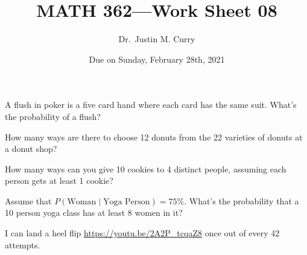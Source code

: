 \documentclass[addpoints,12pt]{exam}
\title{\vspace{-1in} MATH 362---Work Sheet 08}
\date{Due on Sunday, February 28th, 2021}
\author{Dr.~Justin M. Curry}
\begin{document}
\maketitle


\begin{questions}
\question[1] A flush in poker is a five card hand where each card has the same suit. What's the probability of a flush?

\vspace{1in}

\question[1] How many ways are there to choose 12 donuts from the 22 varieties of donuts at a donut shop?

\vspace{1in}

\question[2] How many ways can you give 10 cookies to 4 distinct people, assuming each person gets at least 1 cookie?

\vspace{1in}

\question[2] Assume that $P(\text{Woman}\mid \text{Yoga Person})=75\%$. What's the probability that a 10 person yoga class has at least 8 women in it?

\vspace{1.2in}

\question[6] I can land a heel flip \url{https://youtu.be/2A2P_tcqaZ8} once out of every 42 attempts.
\noaddpoints
{}
\end{questions}
\end{document}
